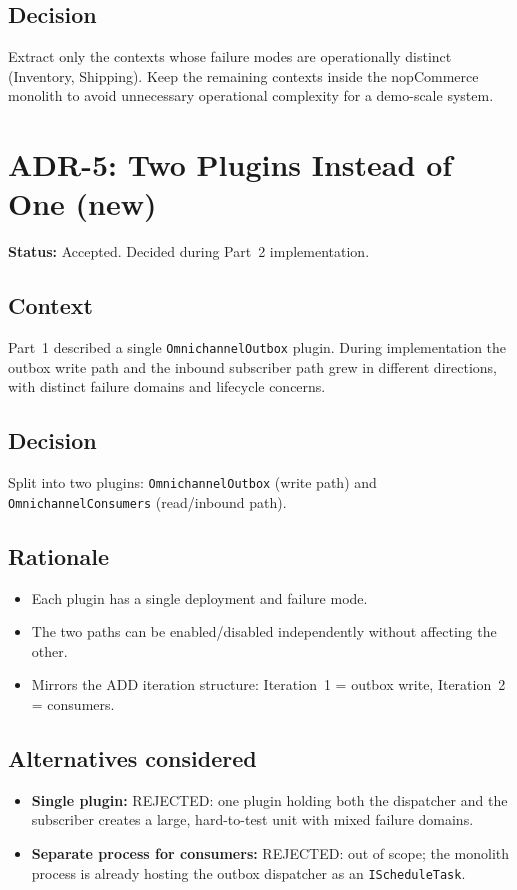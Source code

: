 \subsection*{Decision}
Extract only the contexts whose failure modes are operationally distinct (Inventory, Shipping). Keep the remaining contexts inside the nopCommerce monolith to avoid unnecessary operational complexity for a demo-scale system.

\section*{ADR-5: Two Plugins Instead of One (new)}

\textbf{Status:} Accepted. Decided during Part~2 implementation.

\subsection*{Context}
Part~1 described a single \texttt{OmnichannelOutbox} plugin. During implementation the outbox write path and the inbound subscriber path grew in different directions, with distinct failure domains and lifecycle concerns.

\subsection*{Decision}
Split into two plugins: \texttt{OmnichannelOutbox} (write path) and \texttt{OmnichannelConsumers} (read/inbound path).

\subsection*{Rationale}
\begin{itemize}
    \item Each plugin has a single deployment and failure mode.
    \item The two paths can be enabled/disabled independently without affecting the other.
    \item Mirrors the ADD iteration structure: Iteration~1 = outbox write, Iteration~2 = consumers.
\end{itemize}

\subsection*{Alternatives considered}
\begin{itemize}
    \item \textbf{Single plugin:} REJECTED: one plugin holding both the dispatcher and the subscriber creates a large, hard-to-test unit with mixed failure domains.
    \item \textbf{Separate process for consumers:} REJECTED: out of scope; the monolith process is already hosting the outbox dispatcher as an \texttt{IScheduleTask}.
\end{itemize}

